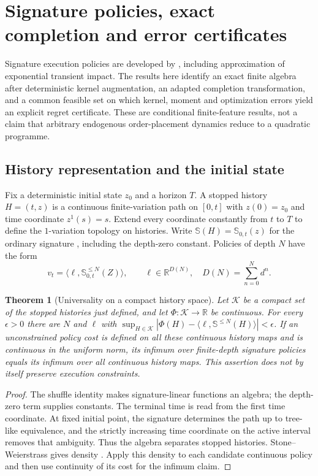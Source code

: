 \documentclass[11pt]{article}
\numberwithin{equation}{section}
\newtheorem{theorem}{Theorem}[section]
\theoremstyle{definition}
\theoremstyle{remark}
\newcommand{\R}{\mathbb{R}}
\theoremstyle{definition}
\begin{document}
\section{Signature policies, exact completion and error certificates}\label{sec:signature}

Signature execution policies are developed by \citet{kalsi2020}, including
approximation of exponential transient impact. The results here identify an
exact finite algebra after deterministic kernel augmentation, an adapted
completion transformation, and a common feasible set on which kernel,
moment and optimization errors yield an explicit regret certificate. These
are conditional finite-feature results, not a claim that arbitrary endogenous
order-placement dynamics reduce to a quadratic programme.

\subsection{History representation and the initial state}
Fix a deterministic initial state $z_0$ and a horizon $T$. A stopped history
$H=(t,z)$ is a continuous finite-variation path on $[0,t]$ with $z(0)=z_0$
and time coordinate $z^1(s)=s$. Extend every coordinate constantly from $t$ to
$T$ to define the $1$-variation topology on histories. Write
$\mathbb S(H)=\mathbb S_{0,t}(z)$ for the ordinary signature \citep{lyons1998}, including the
depth-zero constant. Policies of depth $N$ have the form
\begin{equation}\label{eq:sigpolicy}
 v_t=\langle\ell,\mathbb S^{\le N}_{0,t}(Z)\rangle,
 \qquad \ell\in\R^{D(N)},\quad D(N)=\sum_{n=0}^Nd^n.
\end{equation}

\begin{theorem}[Universality on a compact history space]\label{thm:siguniversal}
Let $\mathcal K$ be a compact set of the stopped histories just defined, and
let $\Phi:\mathcal K\to\R$ be continuous. For every $\epsilon>0$ there are
$N$ and $\ell$ with
$\sup_{H\in\mathcal K}|\Phi(H)-\langle\ell,\mathbb S^{\le N}(H)\rangle|
<\epsilon$. If an unconstrained policy cost is defined on all these
continuous history maps and is continuous in the uniform norm, its infimum
over finite-depth signature policies equals its infimum over all continuous
history maps. This assertion does not by itself preserve execution constraints.
\end{theorem}
\begin{proof}
The shuffle identity makes signature-linear functions an algebra; the
depth-zero term supplies constants. The terminal time is read from the first
time coordinate. At fixed initial point, the signature determines the path up
to tree-like equivalence, and the strictly increasing time coordinate on the
active interval removes that ambiguity. Thus the algebra separates stopped
histories. Stone--Weierstrass gives density
\citep{hamblylyons2010,levin2013,kalsi2020}. Apply this density to each candidate
continuous policy and then use continuity of its cost for the infimum claim.
\end{proof}
\end{document}
